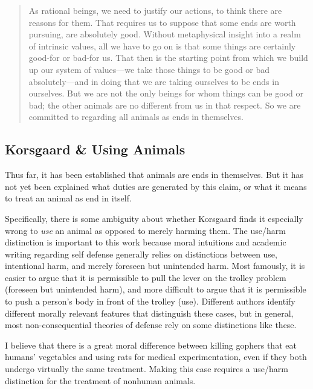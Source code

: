 	\begin{quote} As rational beings, we need to justify our actions, to think
		there are reasons for them. That requires us to suppose that some ends
		are worth pursuing, are absolutely good. Without metaphysical insight
		into a realm of intrinsic values, all we have to go on is that some
		things are certainly good-for or bad-for us. That then is the starting
		point from which we build up our system of values—we take those things
		to be good or bad absolutely—and in doing that we are taking ourselves
		to be ends in ourselves.  But we are not the only beings for whom
		things can be good or bad; the other animals are no different from us
		in that respect. So we are committed to regarding all animals as ends
		in themselves.\autocite[8.5.5]{korsgaard_fellow_creatures} \end{quote}

	\subsection{Korsgaard \& Using Animals}

		Thus far, it has been established that animals are ends in themselves.
		But it has not yet been explained what duties are generated by this
		claim, or what it means to treat an animal as end in itself.

		Specifically, there is some ambiguity about whether Korsgaard finds it
		especially wrong to \emph{use} an animal as opposed to merely harming
		them.  The use/harm distinction is important to this work because moral
		intuitions and academic writing regarding self defense generally relies
		on distinctions between use, intentional harm, and merely foreseen but
		unintended harm.  Most famously, it is easier to argue that it is
		permissible to pull the lever on the trolley problem (foreseen but
		unintended harm), and more difficult to argue that it is permissible to
		push a person’s body in front of the trolley (use). Different authors
		identify different morally relevant features that distinguish these
		cases, but in general, most non-consequential theories of defense rely
		on some distinctions like these.

		I believe that there is a great moral difference between killing
		gophers that eat humans’ vegetables and using rats for medical
		experimentation, even if they both undergo virtually the same
		treatment. Making this case requires a use/harm distinction for the
		treatment of nonhuman animals.

